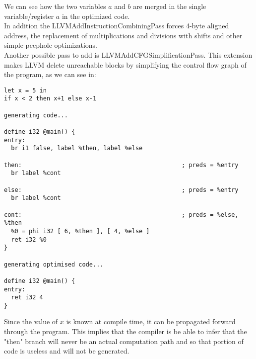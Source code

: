 \documentclass[11pt]{article}
\begin{document}
We can see how the two variables $a$ and $b$ are merged in the single variable/register $a$ in the optimized code. \\
In addition the LLVMAddInstructionCombiningPass forces 4-byte aligned address, the replacement of multiplications and divisions with shifts and other simple peephole optimizations. \\
Another possible pass to add is LLVMAddCFGSimplificationPass. This extension makes LLVM delete unreachable blocks by simplifying the control flow graph of the program, as we can see in:
\begin{verbatim}
let x = 5 in 
if x < 2 then x+1 else x-1

generating code...

define i32 @main() {
entry:
  br i1 false, label %then, label %else

then:                                             ; preds = %entry
  br label %cont

else:                                             ; preds = %entry
  br label %cont

cont:                                             ; preds = %else, %then
  %0 = phi i32 [ 6, %then ], [ 4, %else ]
  ret i32 %0
}

generating optimised code...

define i32 @main() {
entry:
  ret i32 4
}
\end{verbatim}
Since the value of $x$ is known at compile time, it can be propagated forward through the program. This implies that the compiler is be able to infer that the "then" branch will never be an actual computation path and so that portion of code is useless and will not be generated.
\end{document}
